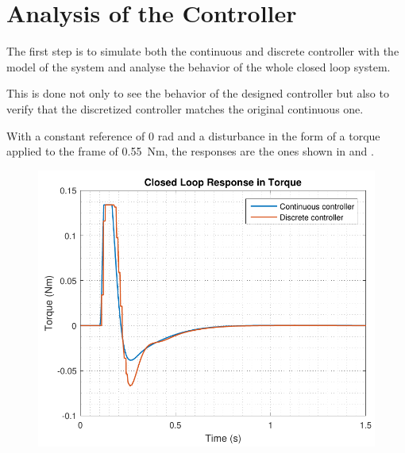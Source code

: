 \section{Analysis of the Controller}\label{sec:ControllerVerification}

The first step is to simulate both the continuous and discrete controller with the model of the system and analyse the behavior of the whole closed loop system.

This is done not only to see the behavior of the designed controller but also to verify that the discretized controller matches the original continuous one. 

With a constant reference of 0 rad and a disturbance in the form of a torque applied to the frame of \SI{0,55}{Nm}, the responses are the ones shown in  and .
%
\begin{minipage}{0.45\linewidth}
	\begin{figure}[H]
      \includegraphics[scale=.5]{figures/torqueComp}
      \captionsetup{justification=centering}
      \label{discreteVsContinuousOutputController}
    \end{figure}\vspace{-5mm}
\end{minipage}
